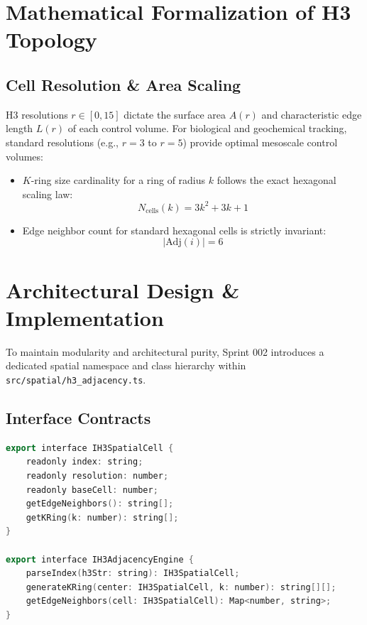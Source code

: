 \documentclass[11pt, a4paper]{article}
\begin{document}
\section{Mathematical Formalization of H3 Topology}

\subsection{Cell Resolution \& Area Scaling}
H3 resolutions $r \in [0, 15]$ dictate the surface area $A(r)$ and characteristic edge length $L(r)$ of each control volume. For biological and geochemical tracking, standard resolutions (e.g., $r=3$ to $r=5$) provide optimal mesoscale control volumes:
\begin{itemize}
    \item $K$-ring size cardinality for a ring of radius $k$ follows the exact hexagonal scaling law:
    \begin{equation}
    N_{\text{cells}}(k) = 3k^2 + 3k + 1
    \end{equation}
    \item Edge neighbor count for standard hexagonal cells is strictly invariant:
    \begin{equation}
    |\text{Adj}(i)| = 6
    \end{equation}
\end{itemize}

\section{Architectural Design \& Implementation}
To maintain modularity and architectural purity, Sprint 002 introduces a dedicated spatial namespace and class hierarchy within \texttt{src/spatial/h3\_adjacency.ts}.

\subsection{Interface Contracts}
\begin{lstlisting}[language=C++]
export interface IH3SpatialCell {
    readonly index: string;
    readonly resolution: number;
    readonly baseCell: number;
    getEdgeNeighbors(): string[];
    getKRing(k: number): string[];
}

export interface IH3AdjacencyEngine {
    parseIndex(h3Str: string): IH3SpatialCell;
    generateKRing(center: IH3SpatialCell, k: number): string[][];
    getEdgeNeighbors(cell: IH3SpatialCell): Map<number, string>;
}
\end{lstlisting}
\end{document}
